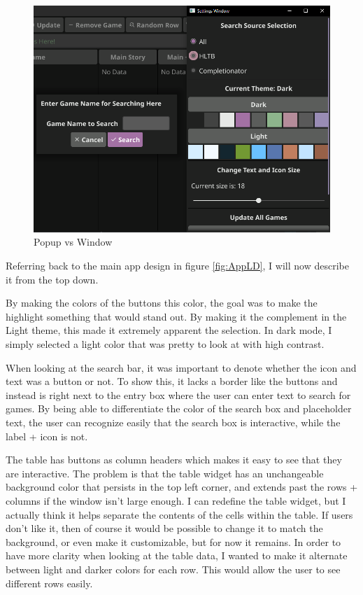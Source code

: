\begin{figure}[htb]
	\centering
	\includegraphics[width=14cm]{./Images/PopVSWind.png}
	\caption{Popup vs Window}
	\label{fig:PopupVSWindow}
\end{figure}

Referring back to the main app design in figure \ref{fig:AppLD}, I
will now describe it from the top down.

By making the colors of the buttons this color, the goal was to make
the highlight something that would stand out. By making it the
complement in the Light theme, this made it extremely apparent the
selection. In dark mode, I simply selected a light color that was
pretty to look at with high contrast.

When looking at the search bar, it was important to denote whether
the icon and text was a button or not. To show this, it lacks a
border like the buttons and instead is right next to the entry box
where the user can enter text to search for games. By being able to
differentiate the color of the search box and placeholder text, the
user can recognize easily that the search box is interactive, while
the label + icon is not.

The table has buttons as column headers which makes it easy to see that they
are interactive. The problem is that the table widget has an
unchangeable background color that persists in the top left corner,
and extends past the rows + columns if the window isn't large enough.
I can redefine the table widget, but I
actually think it helps separate the contents of the cells within the
table. If users don't like it, then of course it would be
possible to change it to match the background, or even make it
customizable, but for now it remains. In order to have more
clarity when looking at the table data, I wanted to make it alternate
between light and darker colors for each row. This would allow the
user to see different rows easily.

